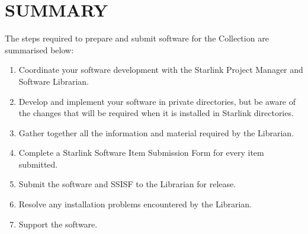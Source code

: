 \section {SUMMARY}
The steps required to prepare and submit software for the Collection are
summarised below:
\begin{enumerate}
\item Coordinate your software development with the Starlink Project Manager and
Software Librarian.
\item Develop and implement your software in private directories, but be aware of
the changes that will be required when it is installed in Starlink directories.
\item Gather together all the information and material required by the Librarian.
\item Complete a Starlink Software Item Submission Form for every item submitted.
\item Submit the software and SSISF to the Librarian for release.
\item Resolve any installation problems encountered by the Librarian.
\item Support the software.
\end{enumerate}
\newpage
\appendix
